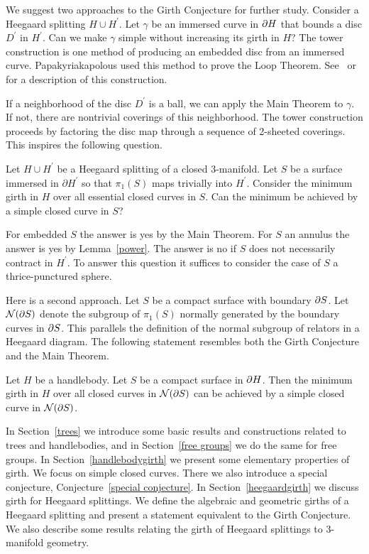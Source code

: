 We suggest two approaches to the Girth Conjecture for further
study.  Consider a Heegaard splitting $H\cup H^\prime$.
Let $\gamma$ be an immersed curve in $\partial H$ 
that bounds a disc $D^\prime$ in $H^\prime$.  Can we make 
$\gamma$ simple without increasing its girth in $H$?
The tower construction is one method of producing an 
embedded disc from an immersed curve.  Papakyriakapolous
used this method to prove the Loop Theorem.
See~\cite[p.45]{Hat} or~\cite[p.7]{Ja} for a description
of this construction.

If a neighborhood of the disc $D^\prime$ is a ball, we can 
apply the Main Theorem to $\gamma$.  If not, there 
are nontrivial coverings of this neighborhood.  The tower construction
proceeds by factoring the disc map through 
a sequence of 2-sheeted coverings.
This inspires the following question.

\begin{question}
Let $H\cup H^\prime$ be a Heegaard splitting of a closed $3$-manifold.
Let $S$ be a surface immersed in $\partial H^\prime$ so that $\pi_1(S)$
maps trivially into $H^\prime$.  Consider the minimum girth in $H$ 
over all essential closed curves in $S$.  Can the minimum be 
achieved by a simple closed curve in $S$?
\end{question} 

For embedded $S$ the answer is yes by the Main Theorem.
For $S$ an annulus the answer is yes by Lemma~\ref{power}.  
The answer is no if $S$ does not necessarily contract in $H^{\prime}$.  
To answer this question it suffices to consider the case of $S$
a thrice-punctured sphere.

Here is a second approach.
Let $S$ be a compact surface with boundary $\partial S$.
Let $\mathcal{N}(\partial S)$ denote the subgroup of $\pi_1(S)$ normally 
generated by the boundary curves in $\partial S$.  This 
parallels the definition of the normal subgroup of relators 
in a Heegaard diagram.
The following statement resembles both the Girth Conjecture 
and the Main Theorem.

\begin{conjecture}
Let $H$ be a handlebody.  Let $S$ be a compact surface in $\partial H$.
Then the minimum girth in $H$ over all closed curves 
in $\mathcal{N}(\partial S)$ can be achieved by a simple closed curve in $\mathcal{N}(\partial S)$.
\end{conjecture}

In Section~\ref{trees} we introduce some basic results and constructions related to trees and handlebodies, and in Section~\ref{free groups} we do the same for free groups.  In Section~\ref{handlebodygirth} we present some elementary properties of girth.  We focus on simple closed curves.  There we also introduce a special conjecture, Conjecture~\ref{special conjecture}. In Section~\ref{heegaardgirth} we discuss girth for Heegaard splittings.  We define the algebraic and geometric girths of 
a Heegaard splitting and present a statement equivalent to the 
Girth Conjecture.  We also describe some results relating 
the girth of Heegaard splittings to 3-manifold geometry.

